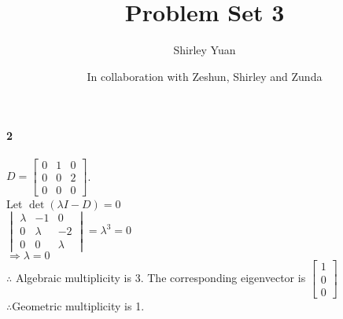 \documentclass[10pt,letter]{article}
\begin{document}


\title{Problem Set 3}

\author{Shirley Yuan}

\date{In collaboration with Zeshun, Shirley and Zunda}

\maketitle



\paragraph{2}
$D=\begin{bmatrix}
0&1&0\\0&0&2\\0&0&0
\end{bmatrix}$. \\
Let $\det(\lambda I-D)=0$\\
$\begin{vmatrix}
\lambda&-1&0\\0&\lambda&-2\\0&0&\lambda
\end{vmatrix}=\lambda^3=0$\\
$\Rightarrow \lambda=0$\\
$\therefore$ Algebraic multiplicity is 3. The corresponding eigenvector is $\begin{bmatrix}
1\\0\\0
\end{bmatrix}$\\
$\therefore$Geometric multiplicity is 1.
\end{document}
